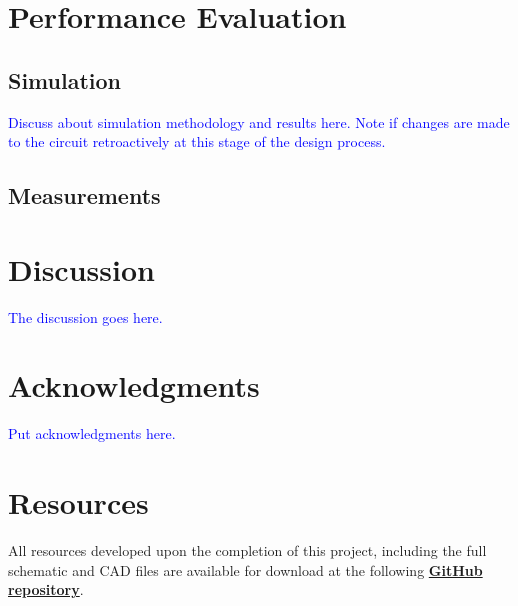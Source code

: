 \documentclass[10pt]{article}
\begin{document}
\begin{multicols*}{2}
        \section{Performance Evaluation}

            \subsection{Simulation}
                \textcolor{blue}{Discuss about simulation methodology and results here. Note if changes are made to the circuit retroactively at this stage of the design process.}

            \subsection{Measurements}
        
        \section{Discussion}
            \textcolor{blue}{The discussion goes here.}

        \section*{Acknowledgments}
            \textcolor{blue}{Put acknowledgments here. }

        \section*{Resources}
            All resources developed upon the completion of this project, including the full schematic and CAD files are available for download at the following \textbf{\textcolor{blue}{\href{https://github.com/ShaunG-RU/DRC-Project}{GitHub repository}}}.

        \printbibliography

    \end{multicols*}
\end{document}
